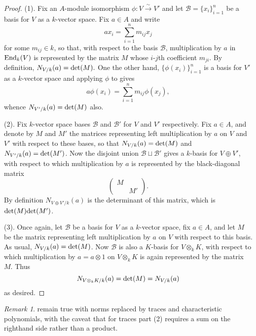 \documentclass[11pt]{amsart}
\numberwithin{equation}{section}
\theoremstyle{remark}
\newtheorem{remark}[equation]{Remark}
\theoremstyle{remark}
\theoremstyle{remark}
\theoremstyle{definition}
\theoremstyle{definition}
\theoremstyle{definition}
\theoremstyle{definition}
\theoremstyle{definition}
\theoremstyle{definition}
\begin{document}
\begin{proof}
(1). Fix an $A$-module isomorphism $\phi:V\stackrel{\sim}{\rightarrow}V'$ and let $\mathcal{B}=\{x_i\}_{i=1}^n$ be a basis for $V$ as a $k$-vector space.  Fix $a\in A$ and write
\begin{equation}\label{matrix coeffs eqn} 
ax_i=\sum_{i=1}^n m_{ij}x_j
\end{equation}
for some $m_{ij}\in k$, so that, with respect to the basis $\mathcal{B}$, multiplication by $a$ in $\textup{End}_k(V)$ is represented by the matrix $M$ whose $i$-$j$th coefficient $m_{ji}$. By definition,
$N_{V/k}(a)=\textup{det}(M).$
One the other hand, $\{\phi(x_i)\}_{i=1}^n$ is a basis for $V'$ as a $k$-vector space and applying $\phi$ to  gives
\[a\phi(x_i)=\sum_{i=1}^nm_{ij}\phi(x_j),\]
whence $N_{V'/k}(a)=\textup{det}(M)$ also. 

(2). Fix $k$-vector space bases $\mathcal{B}$ and $\mathcal{B}'$ for $V$ and $V'$ respectively. Fix $a\in A$, and denote by $M$ and $M'$ the matrices representing left multiplication by $a$ on $V$ and $V'$ with respect to these bases, so that $N_{V/k}(a)=\textup{det}(M)$ and  $N_{V'/k}(a)=\textup{det}(M')$. Now the disjoint union $\mathcal{B}\sqcup \mathcal{B}'$ gives a $k$-basis for $V\oplus V'$, with respect to which multiplication by $a$ is represented by the black-diagonal matrix
\[\left(\begin{array}{cc} M & \\ &M'\end{array}\right).\]
By definition $N_{V\oplus V'/k}(a)$ is the determinant of this matrix, which is $\textup{det}(M)\textup{det}(M')$.

(3). Once again, let $\mathcal{B}$ be a basis for $V$ as a $k$-vector space, fix $a\in A$, and let $M$ be the matrix representing left multiplication by $a$ on $V$ with respect to this basis. As usual, $N_{V/k}(a)=\textup{det}(M)$. Now  $\mathcal{B}$ is also a $K$-basis for $V\otimes_k K$, with respect to which multiplication by $a=a\otimes 1$ on $V\otimes_k K$ is again represented by the matrix $M$. Thus
 \[N_{V\otimes_k K/k}(a)=\textup{det}(M)=N_{V/k}(a)\]
 as desired.  
\end{proof}

\begin{remark}
 remain true with norms replaced by traces and characteristic polynomials, with the caveat that for traces part (2) requires a sum on the righthand side rather than a product.
\end{remark}
\end{document}
